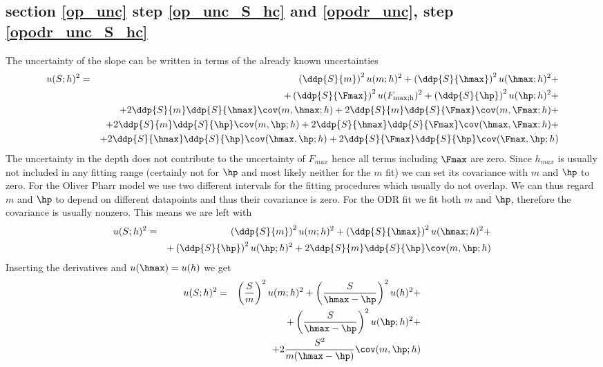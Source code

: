 \subsection{section \ref{op_unc}  step \ref{op_unc_S_hc} and \ref{opodr_unc}, step \ref{opodr_unc_S_hc}} 
The uncertainty of the slope can be written in terms of the already known uncertainties
\begin{eqnarray*}
 u(S;h)^2 &=& 
 \left( \ddp{ S}{ m}\right)^2 u(m;h)^2 + 
 \left( \ddp{ S}{ \hmax} \right)^2 u(\hmax;h)^2 + \\ 
  && +\left( \ddp{ S}{ \Fmax}\right)^2 u(F_\mathrm{max;h})^2 + 
  \left( \ddp{ S}{ \hp}\right)^2 u(\hp;h)^2 +
   \\
  && + 2  \ddp{ S}{ m}\ddp{ S}{ \hmax} \cov(m,\hmax;h)  
  + 2  \ddp{ S}{ m}\ddp{ S}{ \Fmax} \cov(m,\Fmax;h)  + \\
   && + 2  \ddp{ S}{ m}\ddp{ S}{ \hp} \cov(m,\hp;h)  
  + 2  \ddp{ S}{ \hmax}\ddp{ S}{ \Fmax} \cov(\hmax,\Fmax;h)  + \\
  && + 2  \ddp{ S}{ \hmax}\ddp{ S}{ \hp} \cov(\hmax,\hp;h) +
  2  \ddp{ S}{ \Fmax}\ddp{ S}{ \hp} \cov(\Fmax,\hp;h) 
  \end{eqnarray*}
The uncertainty in the depth does not contribute to the uncertainty of $F_{max}$ hence all terms including $\Fmax$ are zero. 
Since $h_{max}$ is usually not included in any fitting range (certainly not for $\hp$ and most likely neither for the $m$ fit) we can set its covariance with $m$ and $\hp$ to zero.
For the Oliver Pharr model we use two different intervals for the fitting procedures which usually do not overlap. We can thus regard $m$ and $\hp$ to depend on different datapoints and thus their covariance is zero. 
For the ODR fit we fit both $m$ and $\hp$, therefore the covariance is usually nonzero.
This means we are left with 
\begin{eqnarray*}
 u(S;h)^2 &=& 
 \left( \ddp{ S}{ m}\right)^2 u(m;h)^2 + 
 \left( \ddp{ S}{ \hmax} \right)^2 u(\hmax;h)^2 + \\ 
  &&  + \left( \ddp{ S}{ \hp}\right)^2 u(\hp;h)^2 
   + 2  \ddp{ S}{ m}\ddp{ S}{ \hp} \cov(m,\hp;h)  
  \end{eqnarray*}
Inserting the derivatives and $u(\hmax)=u(h)$ we get
\begin{eqnarray*}
 u(S;h)^2 &=& 
 \left( \frac{S}{m}\right)^2 u(m;h)^2 + 
 \left( \frac{S}{\hmax-\hp} \right)^2 u(h)^2 + \\ 
  &&  + \left( \frac{S}{\hmax- \hp}\right)^2 u(\hp;h)^2 + \\
  &&
   + 2  \frac{S^2}{m(\hmax -  \hp)} \cov(m,\hp;h)  
  \end{eqnarray*}
